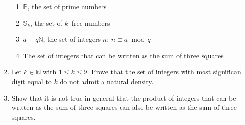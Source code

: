 \documentclass[a4paper,11pt]{article}
\begin{document}
\begin{enumerate}
\begin{enumerate}
  \item $\mathbb P$, the set of prime numbers
  \item $\mathbb S_k$, the set of $k$--free numbers
  \item $a+q\mathbb N$, the set of integers $n$: $n\equiv a\bmod q$
  \item The set of integers that can be written as the sum of three squares
 \end{enumerate}
 \item Let $k\in\mathbb N$ with $1\le k\le 9$. Prove that the set of integers with most significan digit equal to $k$ do not admit 
 a natural density.
 \item Show that it is not true in general that the product of integers that can be written as the sum of three squares can also be written as the 
 sum of three squares.
 \end{enumerate} 
\end{document}
